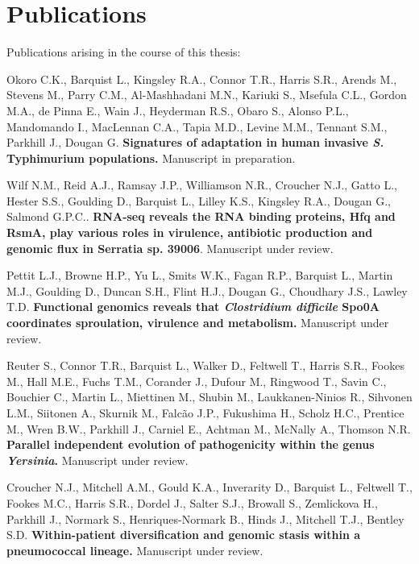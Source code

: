 \chapter{Publications}

Publications arising in the course of this thesis:

\itemize

\item{Okoro C.K., Barquist L., Kingsley R.A., Connor T.R., Harris S.R., Arends M., Stevens M., Parry C.M., Al-Mashhadani M.N., Kariuki S., Msefula C.L., Gordon M.A., de Pinna E., Wain J., Heyderman R.S., Obaro S., Alonso P.L., Mandomando I., MacLennan C.A., Tapia M.D., Levine M.M., Tennant S.M., Parkhill J., Dougan G.  \textbf{Signatures of adaptation in human invasive {\it S.} Typhimurium populations.} Manuscript in preparation.} 

\item{Wilf N.M., Reid A.J., Ramsay J.P., Williamson N.R., Croucher N.J., Gatto L., Hester S.S., Goulding D., Barquist L., Lilley K.S., Kingsley R.A., Dougan G., Salmond G.P.C.. \textbf{RNA-seq reveals the RNA binding proteins, Hfq and RsmA, play various roles in virulence, antibiotic production and genomic flux in Serratia sp. 39006}. Manuscript under review.}

\item{Pettit L.J., Browne H.P., Yu L., Smits W.K., Fagan R.P., Barquist L., Martin M.J., Goulding D., Duncan S.H., Flint H.J., Dougan G., Choudhary J.S., Lawley T.D. \textbf{Functional genomics reveals that \textit{Clostridium difficile} Spo0A coordinates sproulation, virulence and metabolism.} Manuscript under review.}

\item{Reuter S., Connor T.R., Barquist L., Walker D., Feltwell T., Harris S.R., Fookes M., Hall M.E., Fuchs T.M., Corander J., Dufour M., Ringwood T., Savin C., Bouchier C., Martin L., Miettinen M., Shubin M., Laukkanen-Ninios R., Sihvonen L.M., Siitonen A., Skurnik M., Falc\~{a}o J.P., Fukushima H., Scholz H.C., Prentice M., Wren B.W., Parkhill J., Carniel E., Achtman M., McNally A., Thomson N.R. \textbf{Parallel independent evolution of pathogenicity within the genus \textit{Yersinia}.} Manuscript under review.}

\newpage

\item{Croucher N.J., Mitchell A.M., Gould K.A., Inverarity D., Barquist L., Feltwell T., Fookes M.C., Harris S.R., Dordel J., Salter S.J., Browall S., Zemlickova H., Parkhill J., Normark S., Henriques-Normark B., Hinds J., Mitchell T.J., Bentley S.D. \textbf{Within-patient diversification and genomic stasis within a pneumococcal lineage.} Manuscript under review.} 

